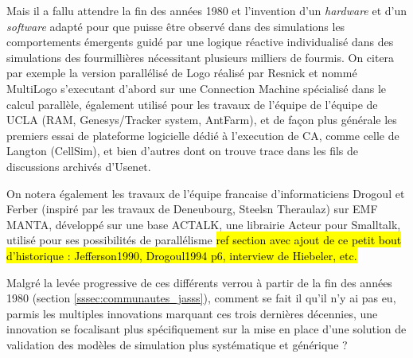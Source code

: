 
Mais il a fallu attendre la fin des années 1980 et l'invention d'un \textit{hardware} et d'un \textit{software} adapté pour que puisse être observé dans des simulations les comportements émergents guidé par une logique réactive individualisé dans des simulations des fourmillières nécessitant plusieurs milliers de fourmis. On citera par exemple la version parallélisé de Logo réalisé par Resnick et nommé MultiLogo s'executant d'abord sur une Connection Machine spécialisé dans le calcul parallèle, également utilisé pour les travaux de l'équipe de l'équipe de UCLA (RAM, Genesys/Tracker system, AntFarm), et de façon plus générale les premiers essai de plateforme logicielle dédié à l'execution de CA, comme celle de Langton (CellSim), et bien d'autres dont on trouve trace dans les fils de discussions archivés d'Usenet. 

On notera également les travaux de l'équipe francaise d'informaticiens Drogoul et Ferber (inspiré par les travaux de Deneubourg, Steelsn Theraulaz) sur EMF MANTA, développé sur une base ACTALK, une librairie Acteur pour Smalltalk, utilisé pour ses possibilités de parallélisme \hl{ref section avec ajout de ce petit bout d'historique : Jefferson1990, Drogoul1994 p6, interview de Hiebeler, etc. } %



Malgré la levée progressive de ces différents verrou à partir de la fin des années 1980 (section \ref{sssec:communautes_jasss}), comment se fait il qu'il n'y ai pas eu, parmis les multiples innovations marquant ces trois dernières décennies, une innovation se focalisant plus spécifiquement sur la mise en place d'une solution de validation des modèles de simulation plus systématique et générique ? 

